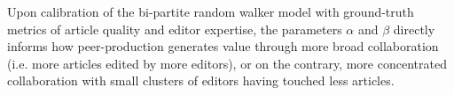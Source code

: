 Upon calibration of the bi-partite random walker model with ground-truth metrics of article quality and editor expertise, the parameters $\alpha$ and $\beta$  directly informs how peer-production generates value through more broad collaboration (i.e. more articles edited by more editors), or on the contrary, more concentrated collaboration with small clusters of editors having touched less articles. 




%
%
%
%


